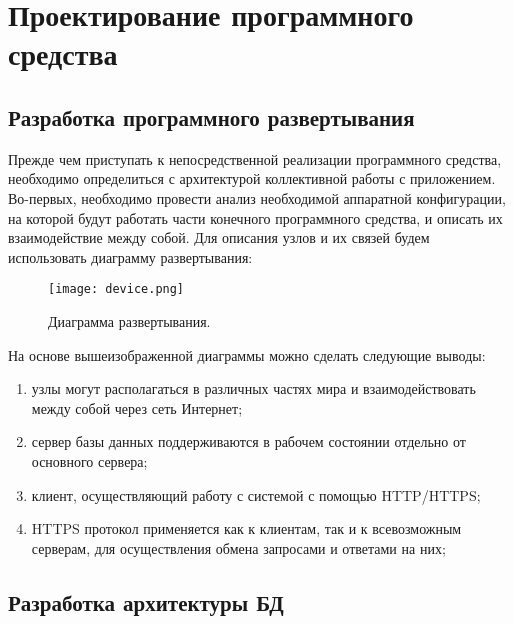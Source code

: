 \section{Проектирование программного средства} %
\label{sec:arch_and_mod}

\subsection{Разработка программного развертывания}
\label{sub:arch_and_mod:graphlib}

Прежде чем приступать к непосредственной реализации программного средства, необходимо определиться с архитектурой коллективной работы с приложением.
Во-первых, необходимо провести анализ необходимой аппаратной конфигурации, на которой будут работать части конечного программного средства, и описать их взаимодействие между собой. Для описания узлов и их связей будем использовать диаграмму развертывания:
\begin{figure}[ht]
\centering
  \texttt{[image: device.png]}  
  \caption{ Диаграмма развертывания. }
  \label{fig:domain:manual_structure:credit_device}
\end{figure}
На основе вышеизображенной диаграммы можно сделать следующие выводы:

\begin{enumerate}
  \item узлы могут располагаться в различных частях мира и взаимодействовать между собой через сеть Интернет;
  \item сервер базы данных поддерживаются в рабочем состоянии отдельно от основного сервера;
  \item клиент, осуществляющий работу с системой с помощью HTTP/HTTPS;
  \item HTTPS протокол применяется как к клиентам, так и к всевозможным серверам, для осуществления обмена запросами и ответами на них;
\end{enumerate}

\subsection{Разработка архитектуры БД }
\label{sub:arch_and_mod:graphlib}

